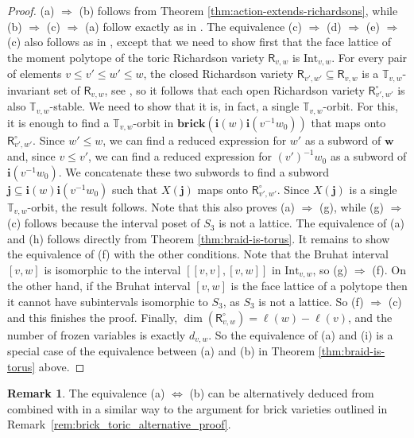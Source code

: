 \documentclass[a4paper, 11pt]{amsart}
\newcommand{\brick}{\mathbf{brick}}
\newcommand{\orich}[1]{\mathsf{R}^{\circ}_{#1}}
\newcommand{\rich}[1]{\mathsf{R}_{#1}}
\newcommand{\word}[1]{\mathbf{#1}}
\newcommand{\dil}[1]{\mathbb{T}_{#1}}
\theoremstyle{definition}
\newtheorem{remark}[theorem]{Remark}
\begin{document}
\begin{proof}
(a) $\Longrightarrow$ (b) follows from Theorem \ref{thm:action-extends-richardsons}, while (b) $\Longrightarrow$ (c) $\Longrightarrow$ (a) follow exactly as in \cite[Lemma 3.5, Theorem 3.6]{GKSB}. The equivalence (c) $\Longrightarrow$ (d) $\Longrightarrow$ (e) $\Longrightarrow$ (c) also follows as in \cite{GKSB}, except that we need to show first that the face lattice of the moment polytope of the toric Richardson variety $\rich{v,w}$ is $\mathrm{Int}_{v,w}$. For every pair of elements $v \leq v' \leq w' \leq w$, the closed Richardson variety $\rich{v', w'} \subseteq \rich{v,w}$ is a $\dil{v,w}$-invariant set of $\rich{v,w}$, see \cite[Theorem 3.1]{Can-Toric}, so it follows that each open Richardson variety $\orich{v',w'}$ is also $\dil{v,w}$-stable. We need to show that it is, in fact, a single $\dil{v,w}$-orbit. For this, it is enough to find a $\dil{v,w}$-orbit in $\brick(\word{i}(w)\word{i}(v^{-1}w_0))$ that maps onto $\orich{v', w'}$. Since $w' \leq w$, we can find a reduced expression for $w'$ as a subword of $\word{w}$ and, since $v \leq v'$, we can find a reduced expression for $(v')^{-1}w_0$ as a subword of $\word{i}(v^{-1}w_0)$. We concatenate these two subwords to find a subword $\word{j} \subseteq \word{i}(w)\word{i}(v^{-1}w_0)$ such that $X(\word{j})$ maps onto $\orich{v',w'}$. Since $X(\word{j})$ is a single $\dil{v,w}$-orbit, the result follows. Note that this also proves (a) $\Longrightarrow$ (g), while (g) $\Longrightarrow$ (c) follows because the interval poset of $S_3$ is not a lattice. The equivalence of (a) and (h) follows directly from Theorem \ref{thm:braid-is-torus}. 
It remains to show the equivalence of (f) with the other conditions. Note that the Bruhat interval $[v,w]$ is isomorphic to the interval $[[v,v], [v,w]]$ in $\mathrm{Int}_{v,w}$, so (g) $\Longrightarrow$ (f). On the other hand, if the Bruhat interval $[v,w]$ is the face lattice of a polytope then it cannot have subintervals isomorphic to $S_3$, as $S_3$ is not a lattice. So (f) $\Longrightarrow$ (c) and this finishes the proof. Finally, $\dim(\orich{v,w}) = \ell(w) - \ell(v)$, and the number of frozen variables is exactly $d_{v,w}$. So the equivalence of (a) and (i) is a special case of the equivalence between (a) and (b) in Theorem \ref{thm:braid-is-torus} above.
\end{proof}

\begin{remark}
The equivalence (a) $\Longleftrightarrow$ (b) can be alternatively deduced from \cite[Theorem 1.7]{EFMS} combined with \cite[Theorem 1.10]{EFM} in a similar way to the argument for brick varieties outlined in Remark~\ref{rem:brick_toric_alternative_proof}.
\end{remark}
\end{document}
